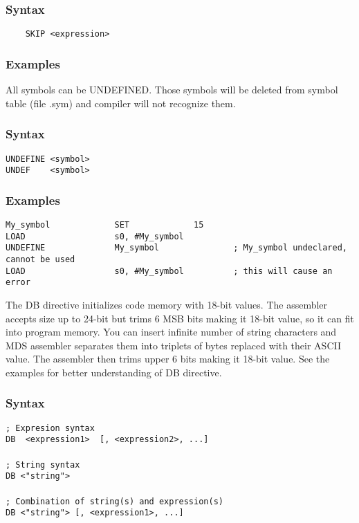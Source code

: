     \subsubsection{Syntax}
        \verb'    SKIP <expression>'

    \subsubsection{Examples}

    All symbols can be UNDEFINED. Those symbols will be deleted from symbol table (file .sym) and compiler will not recognize them.

    \subsubsection{Syntax}
        \verb'UNDEFINE <symbol>'\\
        \verb'UNDEF    <symbol>'

    \subsubsection{Examples}
        \verb'My_symbol             SET             15'\\
        \verb'LOAD                  s0, #My_symbol'\\
        \verb'UNDEFINE              My_symbol               ; My_symbol undeclared, cannot be used'\\
        \verb'LOAD                  s0, #My_symbol          ; this will cause an error'

    The DB directive initializes code memory with 18-bit values. The assembler accepts size up to 24-bit but trims 6 MSB bits making it 18-bit value, so it can fit into program memory. You can insert infinite number of string characters and MDS assembler separates them into triplets of bytes replaced with their ASCII value. The assembler then trims upper 6 bits making it 18-bit value. See the examples for better understanding of DB directive.

    \subsubsection{Syntax}
        \verb'; Expresion syntax'\\
        \verb'DB  <expression1>  [, <expression2>, ...]'\\
        \verb''\\
        \verb'; String syntax'\\
        \verb'DB <"string">'\\
        \verb''\\
        \verb'; Combination of string(s) and expression(s)'\\
        \verb'DB <"string"> [, <expression1>, ...]'

